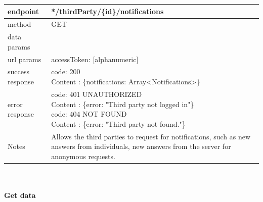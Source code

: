 \begin{legal}
\begin{legal}
\begin{itemize}
								\begin{tabularx}{\linewidth}{| l| l }
									\hline
									endpoint & */thirdParty/\{id\}/notifications \\
									\hline
									method & GET \\
									\hline
									data params & \\
									\hline
									url params &
									\parbox{0.7\textwidth}{
										\bigskip
										accessToken: [alphanumeric]
										\bigskip
									} \\
									\hline
									success response &
									\parbox{0.7\textwidth}{
										\bigskip
										code: 200\\
										Content : \{notifications: Array<Notifications>\}
										\bigskip
									} \\
									\hline
									error response &
									\parbox{0.7\textwidth}{
										\bigskip
										code: 401 UNAUTHORIZED \\
										Content : \{error: "Third party not logged in"\}\\
										code: 404 NOT FOUND \\
										Content : \{error: "Third party not found."\}
										\bigskip
									} \\
									\hline
									Notes & 
									\parbox{0.7\textwidth}{
										\bigskip Allows the third parties to request for notifications, such as new answers from individuals, new answers from the server for anonymous requests.
									\bigskip}  \\
									\hline
								\end{tabularx}\\\\
								
								\textbf{Get data} \\
			

\end{itemize}
\end{legal}
\end{legal}
